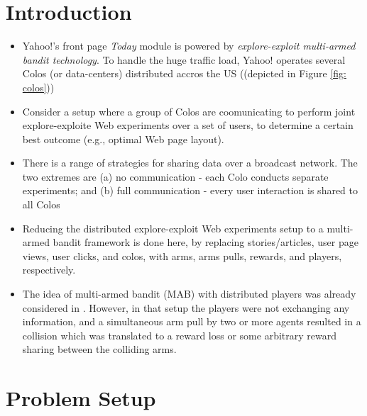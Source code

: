 \documentclass{sig-alternate}
\newcommand{\comment}[1]{}
\begin{document}
\section{Introduction}
\begin{itemize}
\item Yahoo!'s front page \textit{Today} module is powered by \textit{explore-exploit multi-armed bandit technology}. To handle the huge traffic load, Yahoo! operates several Colos (or data-centers) distributed accros the US ((depicted in Figure \ref{fig: colos}))
\item Consider a setup where a group of Colos are coomunicating to perform joint explore-exploite Web experiments over a set of users, to determine a certain best outcome (e.g., optimal Web page layout). 
\item There is a range of strategies for sharing data over a broadcast network. The two extremes are (a) no communication - each Colo conducts separate experiments; and (b) full communication - every user interaction is shared to all Colos
\item Reducing the distributed explore-exploit Web experiments setup to a multi-armed bandit framework is done here, by replacing stories/articles, user page views, user clicks, and colos, with arms, arms pulls, rewards, and players, respectively.
\item The idea of multi-armed bandit (MAB) with distributed players was already considered in \cite{Liu-Zhao_IEEE-TSP2010}. However, in that setup the players were not exchanging any information, and a simultaneous arm pull by two or more agents resulted in a collision which was translated to a reward loss or some arbitrary reward sharing between the colliding arms.
\end{itemize}
\comment{
\begin{itemize}
\item Arms $\Longleftrightarrow$ stories/article
\item Arm pulls $\Longleftrightarrow$ user page views
\item Rewards $\Longleftrightarrow$ users' clicks
\item Players $\Longleftrightarrow$ colos
\end{itemize}}

\section{Problem Setup}
\end{document}

